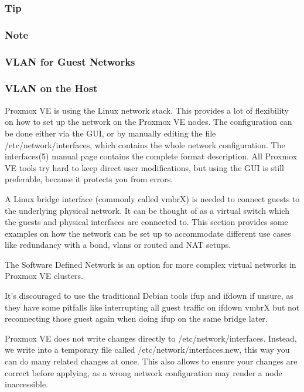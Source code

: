 \subsubsection{Tip}

\subsubsection{Note}

\subsubsection{VLAN for Guest Networks}

\subsubsection{VLAN on the Host}

Proxmox VE is using the Linux network stack. This provides a lot of flexibility on how to set up the network on the Proxmox VE nodes. The configuration can be done either via the GUI, or by manually editing the file /etc/network/interfaces, which contains the whole network configuration. The interfaces(5) manual page contains the complete format description. All Proxmox VE tools try hard to keep direct user modifications, but using the GUI is still preferable, because it protects you from errors.

A Linux bridge interface (commonly called vmbrX) is needed to connect guests to the underlying physical network. It can be thought of as a virtual switch which the guests and physical interfaces are connected to. This section provides some examples on how the network can be set up to accommodate different use cases like redundancy with a bond, vlans or routed and NAT setups.

The Software Defined Network is an option for more complex virtual networks in Proxmox VE clusters.

It’s discouraged to use the traditional Debian tools ifup and ifdown if unsure, as they have some pitfalls like interrupting all guest traffic on ifdown vmbrX but not reconnecting those guest again when doing ifup on the same bridge later.

Proxmox VE does not write changes directly to /etc/network/interfaces. Instead, we write into a temporary file called /etc/network/interfaces.new, this way you can do many related changes at once. This also allows to ensure your changes are correct before applying, as a wrong network configuration may render a node inaccessible.

